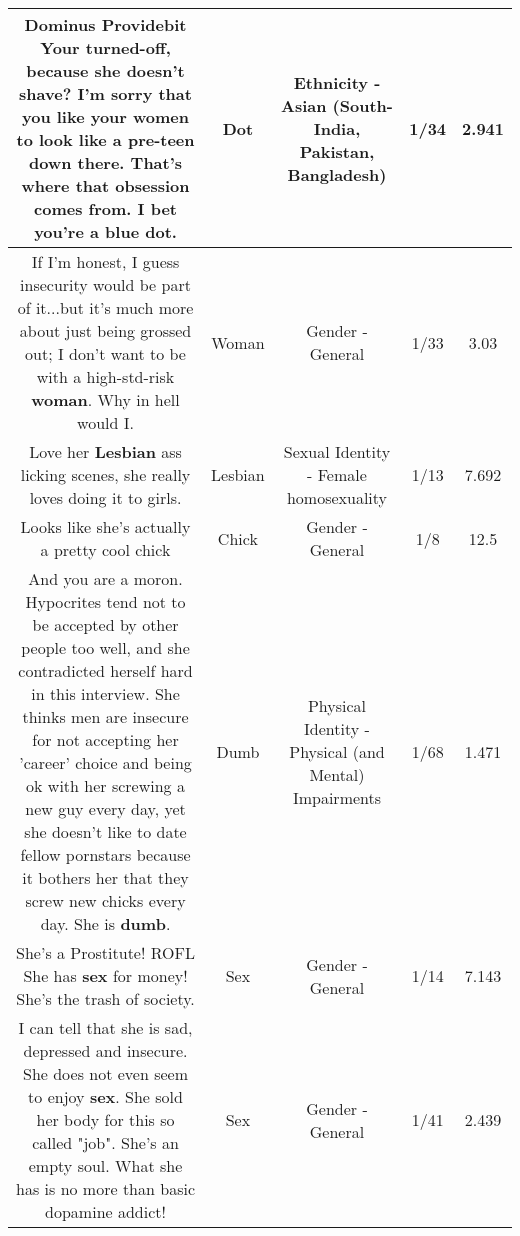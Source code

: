 \documentclass[11pt]{article}
\newlength\mylength
\begin{document}
\begin{center}
\begin{longtable}{|C{.65\mylength}|C{.30\mylength}|C{.12\mylength}|C{.12\mylength}|C{.12\mylength}|}
  \small Dominus Providebit  Your turned-off, because she doesn't shave? I'm sorry that you like your women to look like a pre-teen down there. That's where that obsession comes from. I bet you're a blue \textbf{dot}.\normalsize   & Dot & Ethnicity - Asian (South- India, Pakistan, Bangladesh) & 1/34 & 2.941 \\  \hline
  \small If I'm honest, I guess insecurity would be part of it...but it's much more about just being grossed out; I don't want to be with a high-std-risk \textbf{woman}.  Why in hell would I.\normalsize   & Woman & Gender - General & 1/33 & 3.03 \\  \hline
  \small Love her \textbf{Lesbian} ass licking scenes, she really loves doing it to girls.\normalsize   & Lesbian & Sexual Identity - Female homosexuality & 1/13 & 7.692 \\  \hline
  \small Looks like she's actually a pretty cool chick\normalsize   & Chick & Gender - General & 1/8 & 12.5 \\  \hline
  \small And you are a moron.   Hypocrites tend not to be accepted by other people too well, and she contradicted herself hard in this interview.  She thinks men are insecure for not accepting her 'career' choice and being ok with her screwing a new guy every day, yet she doesn't like to date fellow pornstars because it bothers her that they screw new chicks every day.   She is \textbf{dumb}.\normalsize   & Dumb & Physical Identity - Physical (and Mental) Impairments & 1/68 & 1.471 \\  \hline
  \small She's a Prostitute! ROFL She has \textbf{sex} for money! She's the trash of society.\normalsize   & Sex & Gender - General & 1/14 & 7.143 \\  \hline
  \small I can tell that she is sad, depressed and insecure. She does not even seem to enjoy \textbf{sex}. She sold her body for this so called "job". She's an empty soul. What she has is no more than basic dopamine addict!\normalsize   & Sex & Gender - General & 1/41 & 2.439 \\  \hline

\end{longtable}
\end{center}
\end{document}
